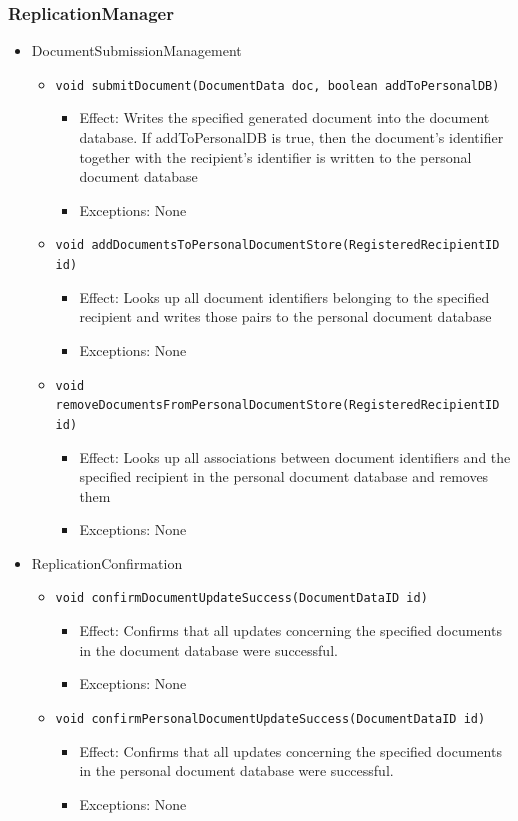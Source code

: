 \documentclass[a4paper,10pt]{article}
\begin{document}
\subsubsection*{ReplicationManager}
\begin{itemize}
	\item DocumentSubmissionManagement
	\begin{itemize}
		\item \texttt{void submitDocument(DocumentData doc, boolean addToPersonalDB)}
		\begin{itemize}
			\item Effect: Writes the specified generated document into the document database. If addToPersonalDB is true, then the document's identifier together with the recipient's identifier is written to the personal document database
			\item Exceptions: None
		\end{itemize}
		
		\item \texttt{void addDocumentsToPersonalDocumentStore(RegisteredRecipientID id)}
		\begin{itemize}
			\item Effect: Looks up all document identifiers belonging to the specified recipient and writes those pairs to the personal document database
			\item Exceptions: None
		\end{itemize}
		
		\item \texttt{void removeDocumentsFromPersonalDocumentStore(RegisteredRecipientID id)}
		\begin{itemize}
			\item Effect: Looks up all associations between document identifiers and the specified recipient in the personal document database and removes them
			\item Exceptions: None
		\end{itemize}
	\end{itemize}
	
	\item ReplicationConfirmation
	\begin{itemize}
		\item \texttt{void confirmDocumentUpdateSuccess(DocumentDataID id)}
		\begin{itemize}
			\item Effect: Confirms that all updates concerning the specified documents in the document database were successful.
			\item Exceptions: None
		\end{itemize}
		
		\item \texttt{void confirmPersonalDocumentUpdateSuccess(DocumentDataID id)}
		\begin{itemize}
			\item Effect: Confirms that all updates concerning the specified documents in the personal document database were successful.
			\item Exceptions: None
		\end{itemize}
	\end{itemize}
\end{itemize}
\end{document}
